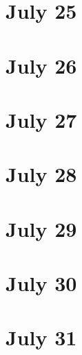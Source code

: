 \section{July 25}

\section{July 26}

\section{July 27}

\section{July 28}

\section{July 29}

\section{July 30}

\section{July 31}

